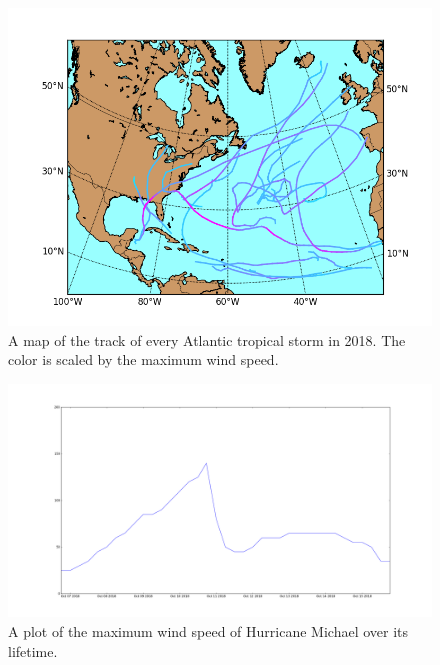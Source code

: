 \begin{figure}
	\centering
	\includegraphics[width=\linewidth]{images/2018_max_winds.png}
	\caption{A map of the track of every Atlantic tropical storm in 2018. The color is scaled by the maximum wind speed.}
	\label{fig:2018_storm_tracks}
\end{figure}

\begin{figure}
	\centering
	\includegraphics[width=\linewidth]{images/hurricane_michael_max_wind.png}
	\caption{A plot of the maximum wind speed of Hurricane Michael over its lifetime.}
\end{figure}